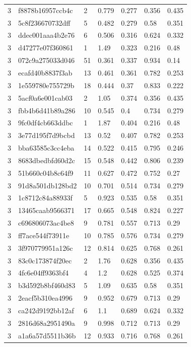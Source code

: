 \begin{tabular}{lllllll}
3 & f8878b16957ccb4c & 2 & 0.779 & 0.277 & 0.356 & 0.435 \\
3 & 5c8f236670732dff & 5 & 0.482 & 0.279 & 0.58 & 0.351 \\
3 & ddec001aaa4b2e76 & 6 & 0.506 & 0.316 & 0.624 & 0.332 \\
3 & d47277e07f360861 & 1 & 1.49 & 0.323 & 0.216 & 0.48 \\
3 & 072c9a275033d046 & 51 & 0.361 & 0.337 & 0.934 & 0.14 \\
3 & ecafd40b8837f3ab & 13 & 0.461 & 0.361 & 0.782 & 0.253 \\
3 & 1e559780e755729b & 18 & 0.444 & 0.37 & 0.833 & 0.222 \\
3 & 5acf0a6e001cab03 & 2 & 1.05 & 0.374 & 0.356 & 0.435 \\
3 & fbb4b6d41b89a286 & 10 & 0.545 & 0.4 & 0.734 & 0.279 \\
3 & 9fc0df4cb663ddbc & 1 & 1.87 & 0.404 & 0.216 & 0.48 \\
3 & 3e77d195f7d9bcbd & 13 & 0.52 & 0.407 & 0.782 & 0.253 \\
3 & bba63585c3cc4eba & 14 & 0.522 & 0.415 & 0.795 & 0.246 \\
3 & 8683dbedbfd60d2c & 15 & 0.548 & 0.442 & 0.806 & 0.239 \\
3 & 51b660c04b8c64f9 & 11 & 0.627 & 0.472 & 0.752 & 0.27 \\
3 & 91d8a501db128bd2 & 10 & 0.701 & 0.514 & 0.734 & 0.279 \\
3 & 1c8712c84a88933f & 5 & 0.923 & 0.535 & 0.58 & 0.351 \\
3 & 13465caab9566371 & 17 & 0.665 & 0.548 & 0.824 & 0.227 \\
3 & c696806073ac4be8 & 9 & 0.781 & 0.557 & 0.713 & 0.29 \\
3 & ff7ace544f73911e & 10 & 0.785 & 0.576 & 0.734 & 0.279 \\
3 & 3f970779951a126c & 12 & 0.814 & 0.625 & 0.768 & 0.261 \\
3 & 83c0c173874f20ec & 2 & 1.76 & 0.628 & 0.356 & 0.435 \\
3 & 4fc6e04ff9363bf4 & 4 & 1.2 & 0.628 & 0.525 & 0.374 \\
3 & b3d592b8bf460d83 & 5 & 1.09 & 0.635 & 0.58 & 0.351 \\
3 & 2eacf5b310ea4996 & 9 & 0.952 & 0.679 & 0.713 & 0.29 \\
3 & ca242d9192bb12af & 6 & 1.1 & 0.689 & 0.624 & 0.332 \\
3 & 2816d68a2951490a & 9 & 0.998 & 0.712 & 0.713 & 0.29 \\
3 & a1a6a57d5511b36b & 12 & 0.933 & 0.716 & 0.768 & 0.261 \\

\end{tabular}
